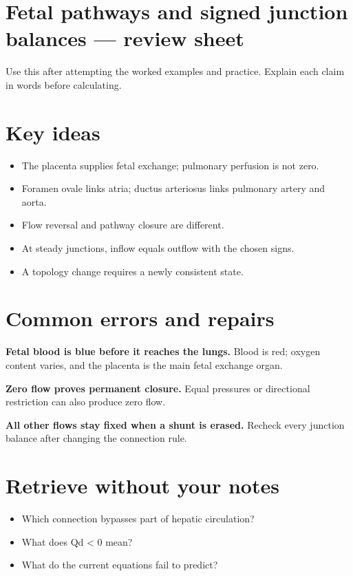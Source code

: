 \documentclass[11pt,letterpaper]{article}
\theoremstyle{definition}\newtheorem{definition}{Definition}\newtheorem{example}{Example}
\numberwithin{equation}{section}
\begin{document}
\section*{Fetal pathways and signed junction balances --- review sheet}
Use this after attempting the worked examples and practice. Explain each claim in words before calculating.

\section*{Key ideas}
\begin{itemize}
\item The placenta supplies fetal exchange; pulmonary perfusion is not zero.
\item Foramen ovale links atria; ductus arteriosus links pulmonary artery and aorta.
\item Flow reversal and pathway closure are different.
\item At steady junctions, inflow equals outflow with the chosen signs.
\item A topology change requires a newly consistent state.
\end{itemize}
\section*{Common errors and repairs}
\textbf{Fetal blood is blue before it reaches the lungs.} Blood is red; oxygen content varies, and the placenta is the main fetal exchange organ.

\textbf{Zero flow proves permanent closure.} Equal pressures or directional restriction can also produce zero flow.

\textbf{All other flows stay fixed when a shunt is erased.} Recheck every junction balance after changing the connection rule.

\section*{Retrieve without your notes}
\begin{itemize}
\item Which connection bypasses part of hepatic circulation?
\item What does Qd < 0 mean?
\item What do the current equations fail to predict?
\end{itemize}
\end{document}
